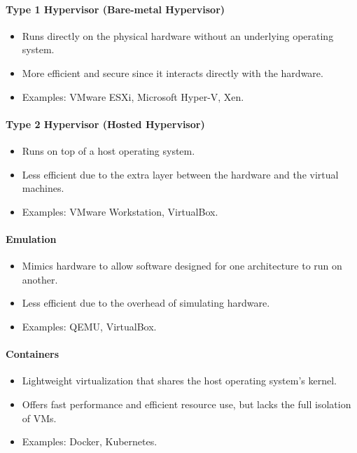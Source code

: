 \documentclass{article}
\begin{document}
\paragraph{Type 1 Hypervisor (Bare-metal Hypervisor)}
\begin{itemize}
    \item Runs directly on the physical hardware without an underlying operating system.
    \item More efficient and secure since it interacts directly with the hardware.
    \item Examples: VMware ESXi, Microsoft Hyper-V, Xen.
\end{itemize}

\paragraph{Type 2 Hypervisor (Hosted Hypervisor)}
\begin{itemize}
    \item Runs on top of a host operating system.
    \item Less efficient due to the extra layer between the hardware and the virtual machines.
    \item Examples: VMware Workstation, VirtualBox.
\end{itemize}

\paragraph{Emulation}
\begin{itemize}
    \item Mimics hardware to allow software designed for one architecture to run on another.
    \item Less efficient due to the overhead of simulating hardware.
    \item Examples: QEMU, VirtualBox.
\end{itemize}

\paragraph{Containers}
\begin{itemize}
    \item Lightweight virtualization that shares the host operating system's kernel.
    \item Offers fast performance and efficient resource use, but lacks the full isolation of VMs.
    \item Examples: Docker, Kubernetes.
\end{itemize}
\end{document}
